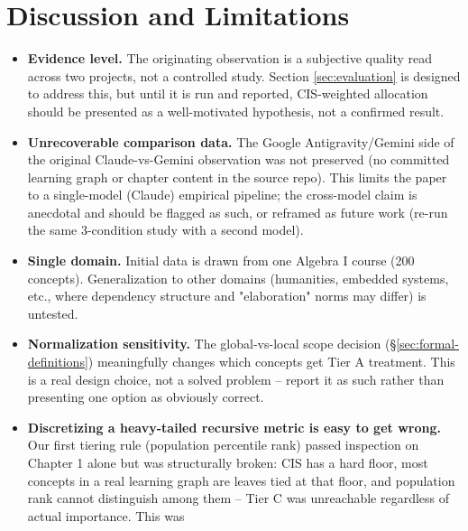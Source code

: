 
\section{Discussion and Limitations}
\label{sec:discussion}

\begin{itemize}
    \item \textbf{Evidence level.} The originating observation is a subjective
          quality read across two projects, not a controlled study. Section
          \ref{sec:evaluation} is designed to address this, but until it is run
          and reported, CIS-weighted allocation should be presented as a
          well-motivated hypothesis, not a confirmed result.
    \item \textbf{Unrecoverable comparison data.} The Google Antigravity/Gemini
          side of the original Claude-vs-Gemini observation was not preserved
          (no committed learning graph or chapter content in the source repo).
          This limits the paper to a single-model (Claude) empirical pipeline;
          the cross-model claim is anecdotal and should be flagged as such, or
          reframed as future work (re-run the same 3-condition study with a
          second model).
    \item \textbf{Single domain.} Initial data is drawn from one Algebra I course
          (200 concepts). Generalization to other domains (humanities, embedded
          systems, etc., where dependency structure and "elaboration" norms may
          differ) is untested.
    \item \textbf{Normalization sensitivity.} The global-vs-local scope
          decision (\S\ref{sec:formal-definitions}) meaningfully changes which
          concepts get Tier A treatment. This is a real design choice, not a
          solved problem -- report it as such rather than presenting one option
          as obviously correct.
    \item \textbf{Discretizing a heavy-tailed recursive metric is easy to get
          wrong.} Our first tiering rule (population percentile rank) passed
          inspection on Chapter 1 alone but was structurally broken: CIS has a
          hard floor, most concepts in a real learning graph are leaves tied
          at that floor, and population rank cannot distinguish among them --
          Tier C was unreachable regardless of actual importance. This was

\end{itemize}
